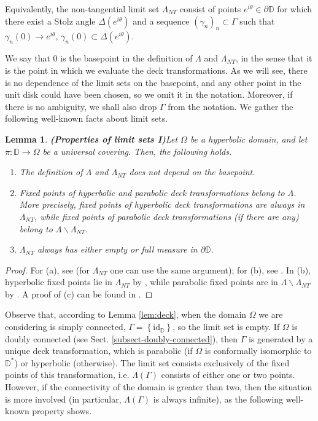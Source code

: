 \documentclass[11pt,a4paper,reqno]{amsart}
\theoremstyle{plain}
\newtheorem{lemma}[thm]{Lemma}
\theoremstyle{definition}
\theoremstyle{plain}
\def\DD{\mathbb{D}}
\begin{document}
Equivalently, the non-tangential limit set $ \Lambda_{NT} $ consist of points $ e^{i\theta}\in \partial \mathbb{D} $ for which there exist a Stolz angle $ \Delta(e^{i\theta}) $ and a sequence $ (\gamma_n)_n\subset \Gamma $ such that $ \gamma_n(0)\to e^{i\theta} $, $ \gamma_n(0)\subset \Delta(e^{i\theta}) $.

We say that 0 is the basepoint in the  definition of $ \Lambda $ and $ \Lambda_{NT} $, in the sense that it is the point in which we evaluate the deck transformations. As we will see, there is no dependence of the limit sets on the basepoint, and any other point in the unit disk could have been chosen, so we omit it in the notation. Moreover, if there is no ambiguity, we shall also drop $\Gamma$ from the notation. We gather the following well-known facts about limit sets.

\begin{lemma}{\bf (Properties of limit sets I)}\label{lemma-limit-sets}
	Let $ \Omega $ be a hyperbolic domain, and let $ \pi\colon \mathbb{D}\to\Omega $ be a universal covering. Then, the following holds.
	\begin{enumerate}[label={\em (\alph*)}]
		\item The definition of $ \Lambda $ and $ \Lambda_{NT} $ does not depend on the basepoint.
		\item Fixed points of hyperbolic and parabolic deck transformations belong to $ \Lambda $. More precisely, fixed points of hyperbolic deck transformations are always in $\Lambda_{NT}$, while fixed points of parabolic deck transformations (if there are any) belong to $\Lambda\smallsetminus\Lambda_{NT}$.
		\item $\Lambda_{NT}$ always has either empty or full measure in $\partial\DD$.
	\end{enumerate}
\end{lemma}
\begin{proof}
	For (a), see \cite[Prop. 3.4.1]{Hub06} (for $\Lambda_{NT}$ one can use the same argument); for (b), see  \cite[p. 76]{Hub06}. In (b), hyperbolic fixed points lie in $\Lambda_{NT}$ by \cite[Prop. 2]{BM74}, while parabolic fixed points are in $\Lambda\smallsetminus\Lambda_{NT}$ by \cite[Prop. 3]{BM74}.
	 A proof of (c) can be found in \cite[p. 6]{Fer89}.
\end{proof}

Observe that, according to Lemma \ref{lem:deck}, when the domain $ \Omega $ we are considering is simply connected, $ \Gamma=\left\lbrace \textrm{id}_\mathbb{D}\right\rbrace  $, so the limit set is empty. If $ \Omega $ is doubly connected (see Sect. \ref{subsect-doubly-connected}), then $ \Gamma $ is generated by a unique deck transformation, which is parabolic (if $ \Omega $ is conformally isomorphic to $ \mathbb{D}^* $) or hyperbolic (otherwise). The limit set consists exclusively of the fixed points of this transformation, i.e. $ \Lambda(\Gamma)$  consists of either one or two points. 
However, if the connectivity of the domain is greater than two, then the situation is more involved (in particular, $ \Lambda(\Gamma) $ is always infinite), as the following well-known property shows.
\end{document}
